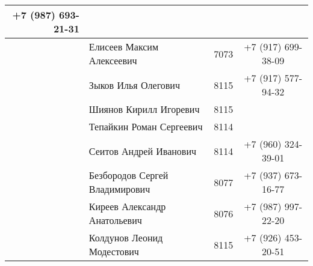 \documentclass[a4paper,12pt]{article} %
\newcounter{magicrownumbers}
\newcommand\rownumber{\stepcounter{magicrownumbers}\arabic{magicrownumbers}}
\begin{document}
\begin{longtable}{r|l|c|c}
		+7 (987) 693-21-31\\
		\midrule
		\rownumber & Елисеев Максим Алексеевич & 7073 &
		+7 (917) 699-38-09\\
		\midrule
		\rownumber & Зыков Илья Олегович & 8115 &
		+7 (917) 577-94-32\\
		\midrule
		\rownumber & Шиянов Кирилл Игоревич & 8115 &\\
		\midrule
		\rownumber & Тепайкин Роман Сергеевич & 8114 & 	\\
		\midrule
		\rownumber & Сеитов Андрей Иванович & 8114 &
		+7 (960) 324-39-01\\
		\midrule
		\rownumber & Безбородов Сергей Владимирович & 8077 &
		+7 (937) 673-16-77\\
		\midrule
		\rownumber & Киреев Александр Анатольевич & 8076 &
		+7 (987) 997-22-20\\
		\midrule
		\rownumber & Колдунов Леонид Модестович & 8115 &
		+7 (926) 453-20-51\\
		\bottomrule
	\end{longtable}
\end{document}
